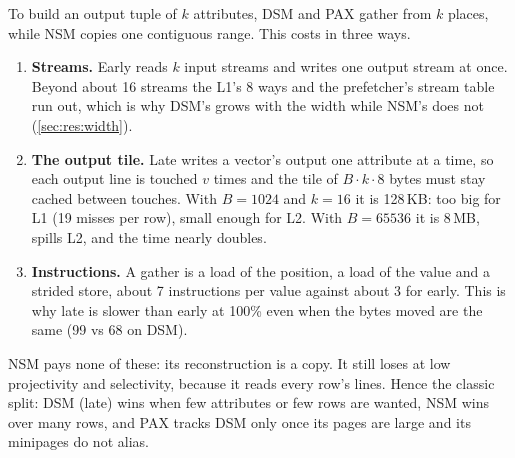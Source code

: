 To build an output tuple of $k$ attributes, DSM and PAX gather from $k$ places, while NSM copies
one contiguous range. This costs in three ways.
\begin{enumerate}
\item \textbf{Streams.} Early reads $k$ input streams and writes one output stream at once.
Beyond about 16 streams the L1's 8 ways and the prefetcher's stream table run out, which is
why DSM's  grows with the width while NSM's does not (\cref{sec:res:width}).
\item \textbf{The output tile.} Late writes a vector's output one attribute at a time, so each
output line is touched $v$ times and the tile of $B \cdot k \cdot 8$ bytes must stay cached
between touches. With $B{=}1024$ and $k{=}16$ it is 128\,KB: too big for L1 (19 misses per
row), small enough for L2. With $B{=}65536$ it is 8\,MB, spills L2, and the time nearly
doubles.
\item \textbf{Instructions.} A gather is a load of the position, a load of the value and a
strided store, about 7 instructions per value against about 3 for early. This is why late is
slower than early at 100\% even when the bytes moved are the same (99 vs 68\ms{} on DSM).
\end{enumerate}
NSM pays none of these: its reconstruction is a copy. It still loses at low projectivity and
selectivity, because it reads every row's lines. Hence the classic split: DSM (late) wins when
few attributes or few rows are wanted, NSM wins  over many rows, and PAX tracks
DSM only once its pages are large and its minipages do not alias.
